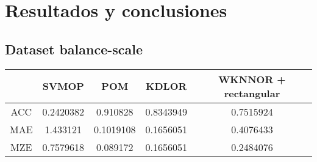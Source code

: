 \chapter{Resultados y conclusiones}
\label{conclusion}

\section{Dataset balance-scale}
\begin{tabular}{ c c c c c }
	& SVMOP & POM & KDLOR & WKNNOR + rectangular \\
	\hline	
ACC &	0.2420382 & 0.910828 & 0.8343949 & 0.7515924\\
MAE &	1.433121 & 0.1019108 & 0.1656051 & 0.4076433\\
MZE &	0.7579618 & 0.089172 & 0.1656051 & 0.2484076 \\
	\hline  
	
	
\end{tabular}

